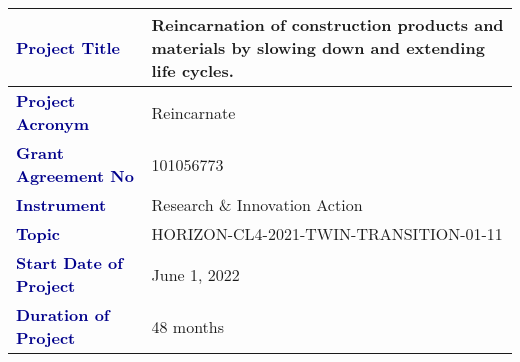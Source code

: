 

\begin{table}[h]
\centering
\renewcommand{\arraystretch}{1.7}
\begin{tabularx}{\textwidth}{|C|C|}
\hline
\textcolor{darkblue}{\textbf{Project Title}} & Reincarnation of construction products and materials by slowing down and extending life cycles. \\ \hline
\textcolor{darkblue}{\textbf{Project Acronym}} & Reincarnate \\ \hline
\textcolor{darkblue}{\textbf{Grant Agreement No}} & 101056773 \\ \hline
\textcolor{darkblue}{\textbf{Instrument}} & Research \& Innovation Action \\ \hline
\textcolor{darkblue}{\textbf{Topic}} & HORIZON-CL4-2021-TWIN-TRANSITION-01-11 \\ \hline
\textcolor{darkblue}{\textbf{Start Date of Project}} & June 1, 2022 \\ \hline
\textcolor{darkblue}{\textbf{Duration of Project}} & 48 months \\ \hline
\end{tabularx}
\end{table}
